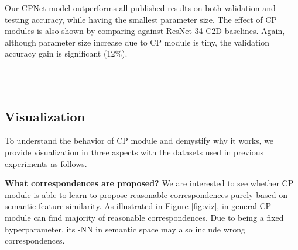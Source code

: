 \documentclass[10pt,twocolumn,letterpaper]{article}
\begin{document}
Our CPNet model outperforms all published results on both validation and testing accuracy, while having the smallest parameter size. The effect of CP modules is also shown by comparing against ResNet-34 C2D baselines. Again, although parameter size increase due to CP module is tiny, the validation accuracy gain is significant (12\%).



\begin{figure*}[h]
\captionsetup{position=bottom}
\centering
{} \vspace{-2ex} \\
 \vspace{-2ex} \\
\caption{Visualization on our final models. The starting points of arrows are located at feature . Arrows point to the  proposed correspondences () of feature . Proposed correspondences whose indices are in  (defined in Equation \eqref{eq:activate:neighbor}) are pointed by \textcolor{red}{red arrows} otherwise by \textcolor{blue}{blue arrows}. Feature changes after going through CP module are shown in heatmaps.} 
\label{fig:viz}
\end{figure*}



\subsection{Visualization}


To understand the behavior of CP module and demystify why it works,
we provide visualization in three aspects with the datasets used in previous experiments as follows.

\textbf{What correspondences are proposed?} We are interested to see whether CP module is able to learn to propose reasonable correspondences purely based on semantic feature similarity. As illustrated in Figure \ref{fig:viz}, in general CP module can find majority of reasonable correspondences. Due to  being a fixed hyperparameter, its -NN in semantic space may also include wrong correspondences.
\end{document}
